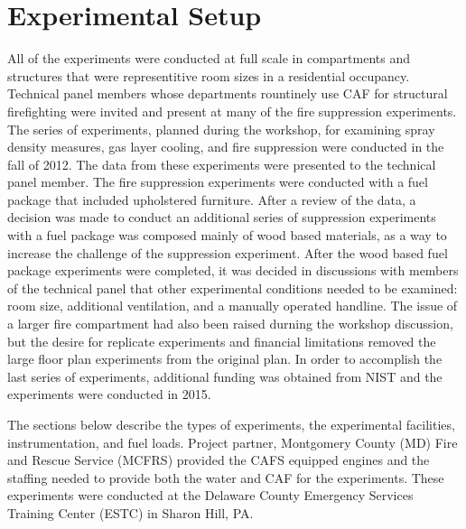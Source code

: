 \documentclass[12pt,oneside]{book}
\begin{document}
\chapter{Experimental Setup}

All of the experiments were conducted at full scale in compartments and structures that were representitive room sizes in a residential occupancy.  Technical panel members whose departments rountinely use CAF for structural firefighting were invited and present at many of the fire suppression experiments.  The series of experiments, planned during the workshop, for examining spray density measures, gas layer cooling, and fire suppression were conducted in the fall of 2012.  The data from these experiments were presented to the technical panel member.   The fire suppression experiments were conducted with a fuel package that included upholstered furniture.  After a review of the data, a decision was made to conduct an additional series of suppression experiments with a fuel package was composed mainly of wood based materials, as a way to increase the challenge of the suppression experiment.  After the wood based fuel package experiments were completed, it was decided in discussions with members of the technical panel that other experimental conditions needed to be examined: room size, additional ventilation, and a manually operated handline.  The issue of a larger fire compartment had also been raised durning the workshop discussion, but the desire for replicate experiments and financial limitations removed the large floor plan experiments from the original plan.  In order to accomplish the last series of experiments, additional funding was obtained from NIST and the experiments were conducted in 2015. 

The sections below describe the types of experiments, the experimental facilities, instrumentation, and fuel loads.  Project partner, Montgomery County (MD) Fire and Rescue Service (MCFRS) provided the CAFS equipped engines and the staffing needed to provide both the water and CAF for the experiments. These experiments were conducted at the Delaware County Emergency Services Training Center (ESTC) in Sharon Hill, PA.


            
\end{document}
